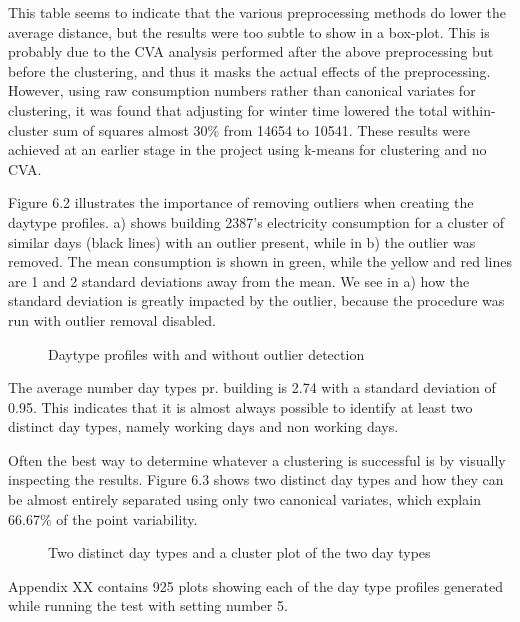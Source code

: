This table seems to indicate that the various preprocessing methods do lower the average distance, but the results were too subtle to show in a box-plot. This is probably due to the CVA analysis performed after the above preprocessing but before the clustering, and thus it masks the actual effects of the preprocessing. However, using raw consumption numbers rather than canonical variates for clustering, it was found that adjusting for winter time lowered the total within-cluster sum of squares almost 30\% from 14654 to 10541. These results were achieved at an earlier stage in the project using k-means for clustering and no CVA.

Figure 6.2 illustrates the importance of removing outliers when creating the daytype profiles. a) shows building 2387’s electricity consumption for a cluster of similar days (black lines) with an outlier present, while in b) the outlier was removed. The mean consumption is shown in green, while the yellow and red lines are 1 and 2 standard deviations away from the mean. We see in a) how the standard deviation is greatly impacted by the outlier, because the procedure was run with outlier removal disabled.
\begin{figure}
\begin{center}

\end{center}
\caption{Daytype profiles with and without outlier detection}
\end{figure}

The average number day types pr. building is 2.74 with a standard deviation of 0.95. This indicates that it is almost always possible to identify at least two distinct day types, namely working days and non working days. 

Often the best way to determine whatever a clustering is successful is by visually inspecting the results. Figure 6.3 shows two distinct day types and how they can be almost entirely separated using only two canonical variates, which explain 66.67\% of the point variability.
\begin{figure}
\begin{center}

\end{center}
\caption{Two distinct day types and a cluster plot of the two day types}
\end{figure}

Appendix XX contains 925 plots showing each of the day type profiles generated while running the test with setting number 5.

